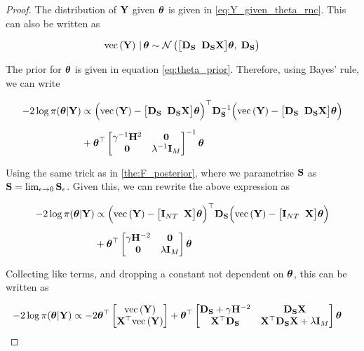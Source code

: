 \begin{proof}

    The distribution of $\mathbf{Y}$ given $\boldsymbol{\theta}$ is given in \cref{eq:Y_given_theta_rnc}. This can also be written as

    \begin{equation}
        \text{\textup{vec}}\left(\mathbf{Y}\right) \, | \, \boldsymbol{\theta} \sim \mathcal{N}\left(  \big[ \mathbf{D}_{\mathbf{S}} \;\; \mathbf{D}_{\mathbf{S}} \mathbf{X} \big]\boldsymbol{\theta}  , \; \mathbf{D}_{\mathbf{S}} \right)
    \end{equation}

    The prior for $\boldsymbol{\theta}$ is given in equation \cref{eq:theta_prior}. Therefore, using Bayes' rule, we can write 

    \begin{align*}
        -2\log \pi(\boldsymbol{\theta} | \mathbf{Y}) &\propto \Big(\text{\textup{vec}}\left(\mathbf{Y}\right) - \big[ \mathbf{D}_{\mathbf{S}} \;\; \mathbf{D}_{\mathbf{S}} \mathbf{X} \big] \boldsymbol{\theta} \Big)^\top \mathbf{D}_{\mathbf{S}}^{-1} \Big(\text{\textup{vec}}\left(\mathbf{Y}\right) - \big[ \mathbf{D}_{\mathbf{S}} \;\; \mathbf{D}_{\mathbf{S}} \mathbf{X} \big] \boldsymbol{\theta} \Big) \\[0.2cm]
        & + \boldsymbol{\theta}^\top  \begin{bmatrix}
            \gamma^{-1} \mathbf{H}^{2} & \mathbf{0}\\
            \mathbf{0} & \lambda^{-1} \mathbf{I}_M   
           \end{bmatrix} ^{-1} \boldsymbol{\theta}
    \end{align*}

    Using the same trick as in \cref{the:F_posterior}, where we parametrise $\mathbf{S}$ as $\mathbf{S} = \lim_{\epsilon \rightarrow 0} \mathbf{S}_{\epsilon}$. Given this, we can rewrite the above expression as 

    \begin{align*}
        -2\log \pi(\boldsymbol{\theta} | \mathbf{Y}) &\propto \Big(\text{\textup{vec}}\left(\mathbf{Y}\right) - \big[ \mathbf{I}_{NT} \;\; \mathbf{X} \big] \boldsymbol{\theta} \Big)^\top \mathbf{D}_{\mathbf{S}}\Big(\text{\textup{vec}}\left(\mathbf{Y}\right) - \big[ \mathbf{I}_{NT} \;\; \mathbf{X} \big] \boldsymbol{\theta} \Big) \\[0.2cm]
        & + \boldsymbol{\theta}^\top  \begin{bmatrix}
            \gamma \mathbf{H}^{-2} & \mathbf{0}\\
            \mathbf{0} & \lambda \mathbf{I}_M   
           \end{bmatrix} \boldsymbol{\theta}
    \end{align*}

    Collecting like terms, and dropping a constant not dependent on $\boldsymbol{\theta}$, this can be written as 

    \begin{align*}
        -2\log \pi(\boldsymbol{\theta} | \mathbf{Y}) &\propto -2 \boldsymbol{\theta}^\top \begin{bmatrix} \text{\textup{vec}}\left(\mathbf{Y}\right) \\ \mathbf{X}^\top \text{\textup{vec}}\left(\mathbf{Y}\right) \end{bmatrix} + \boldsymbol{\theta}^\top \begin{bmatrix}
            \mathbf{D}_{\mathbf{S}} + \gamma \mathbf{H}^{-2} & \mathbf{D}_{\mathbf{S}}  \mathbf{X} \\
            \mathbf{X}^\top \mathbf{D}_{\mathbf{S}} & \mathbf{X}^\top \mathbf{D}_{\mathbf{S}} \mathbf{X} + \lambda \mathbf{I}_M   
           \end{bmatrix} \boldsymbol{\theta}
    \end{align*}


\end{proof}

